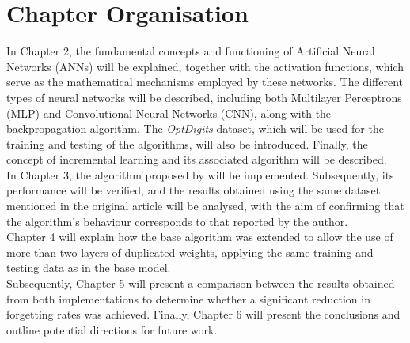 \section{Chapter Organisation}

In Chapter 2, the fundamental concepts and functioning of Artificial Neural Networks (ANNs) will be explained, together with the activation functions, which serve as the mathematical mechanisms employed by these networks.  
The different types of neural networks will be described, including both Multilayer Perceptrons (MLP) and Convolutional Neural Networks (CNN), along with the backpropagation algorithm.  
The \textit{OptDigits} dataset, which will be used for the training and testing of the algorithms, will also be introduced.  
Finally, the concept of incremental learning and its associated algorithm will be described. \\

In Chapter 3, the algorithm proposed by \cite{bullinaria2009} will be implemented. Subsequently, its performance will be verified, and the results obtained using the same dataset mentioned in the original article will be analysed, with the aim of confirming that the algorithm’s behaviour corresponds to that reported by the author. \\

Chapter 4 will explain how the base algorithm was extended to allow the use of more than two layers of duplicated weights, applying the same training and testing data as in the base model. \\

Subsequently, Chapter 5 will present a comparison between the results obtained from both implementations to determine whether a significant reduction in forgetting rates was achieved.  
Finally, Chapter 6 will present the conclusions and outline potential directions for future work.
